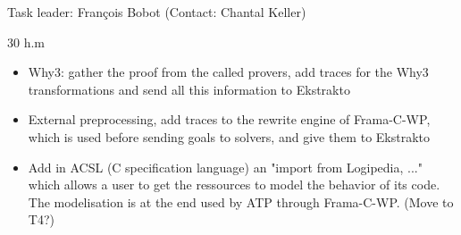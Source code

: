 \begin{workpackage}
\begin{tasklist}
\begin{task}[id=cooperation, title=Make ATPs cooperate]
  Task leader: François Bobot (Contact: Chantal Keller)

  30 h.m


\begin{itemize}
\item Why3: gather the proof from the called provers, add traces for the
  Why3 transformations and send all this information to Ekstrakto
\item External preprocessing, add traces to the rewrite engine of
  Frama-C-WP, which is used before sending goals to solvers, and give
  them to Ekstrakto
\item Add in ACSL (C specification language) an "import from Logipedia,
  ..." which allows a user to get the ressources to model the behavior
  of its code. The modelisation is at the end used by ATP through
  Frama-C-WP. (Move to T4?)
\end{itemize}

\end{task}
\end{tasklist}





\end{workpackage}
